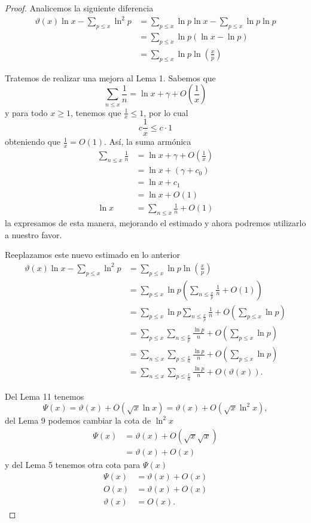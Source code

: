 \documentclass{article}
\theoremstyle{definition}
\theoremstyle{remark}
\begin{document}
\begin{proof}
Analicemos la siguiente diferencia
\begin{align*}
\vartheta(x)\ln x - \sum_{p \leq x} \ln^2 p &= \sum_{p \leq x} \ln p \ln x - \sum_{p \leq x} \ln p \ln p \\
&= \sum_{p \leq x} \ln p (\ln x - \ln p) \\
&= \sum_{p \leq x} \ln p \ln \left(\frac{x}{p}\right)
\end{align*}

Tratemos de realizar una mejora al Lema 1. Sabemos que
$$\sum_{n \leq x} \frac{1}{n} = \ln x + \gamma + O\left(\frac{1}{x}\right)$$
y para todo $x \geq 1$, tenemos que $\frac{1}{x} \leq 1$, por lo cual
$$c\frac{1}{x} \leq c \cdot 1$$
obteniendo que $\frac{1}{x} = O(1)$. As\'i, la suma arm\'onica
\begin{align*}
\sum_{n \leq x} \frac{1}{n} &= \ln x + \gamma + O\left(\frac{1}{x}\right) \\
&= \ln x + (\gamma + c_0) \\
&= \ln x + c_1 \\
&= \ln x + O(1) \\
\ln x &= \sum_{n \leq x} \frac{1}{n} + O(1)
\end{align*}
la expresamos de esta manera, mejorando el estimado y ahora podremos utilizarlo a nuestro favor.

Reeplazamos este nuevo estimado en lo anterior
\begin{align*}
\vartheta(x)\ln x - \sum_{p \leq x} \ln^2 p &= \sum_{p \leq x} \ln p \ln \left(\frac{x}{p}\right) \\
&= \sum_{p \leq x} \ln p \left(\sum_{n \leq \frac{x}{p}} \frac{1}{n} + O(1)\right) \\
&= \sum_{p \leq x} \ln p \sum_{n \leq \frac{x}{p}} \frac{1}{n} + O\left(\sum_{p \leq x} \ln p\right) \\
&= \sum_{p \leq x} \sum_{n \leq \frac{x}{p}} \frac{\ln p}{n} + O\left(\sum_{p \leq x} \ln p\right) \\
&= \sum_{n \leq x} \sum_{p \leq \frac{x}{n}} \frac{\ln p}{n} + O\left(\sum_{p \leq x} \ln p\right) \\
&= \sum_{n \leq x} \sum_{p \leq \frac{x}{n}} \frac{\ln p}{n} + O(\vartheta(x)).
\end{align*}

Del Lema 11 tenemos
$$\Psi(x) = \vartheta(x) + O(\sqrt{x}\ln x) = \vartheta(x) + O(\sqrt{x} \ln^2 x),$$
del Lema 9 podemos cambiar la cota de $\ln^2 x$
\begin{align*}
\Psi(x) &= \vartheta(x) + O(\sqrt{x}\sqrt{x}) \\
&= \vartheta(x) + O(x)
\end{align*}
y del Lema 5 tenemos otra cota para $\Psi(x)$
\begin{align*}
\Psi(x) &= \vartheta(x) + O(x) \\
O(x) &= \vartheta(x) + O(x) \\
\vartheta(x) &= O(x).
\end{align*}


\end{proof}
\end{document}
